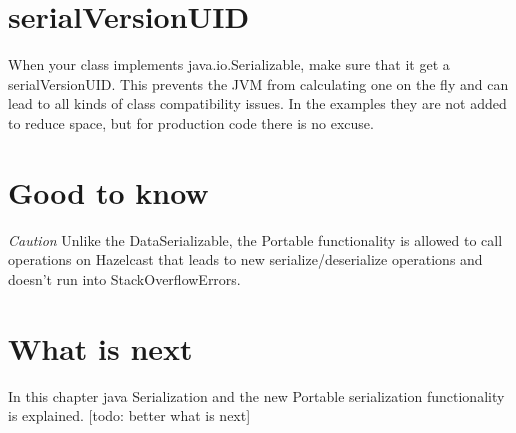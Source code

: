 \section{serialVersionUID} 
When your class implements java.io.Serializable, make sure that it get a serialVersionUID. This prevents the JVM from calculating one on the fly and can lead to all kinds of class compatibility issues. In the examples they are not added to reduce space, but for production code there is no excuse.

\section{Good to know}

\emph{Caution}  Unlike the DataSerializable, the Portable functionality is allowed to call operations on Hazelcast that leads to new serialize/deserialize operations and doesn't run into StackOverflowErrors.

\section{What is next}
In this chapter java Serialization and the new Portable serialization functionality is explained. [todo: better what is next]
